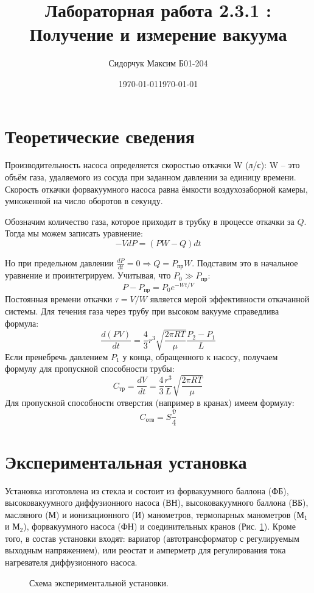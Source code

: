 \documentclass[a4paper,12pt]{article} %
\date{\today}
\title{Лабораторная работа 2.3.1 : Получение и измерение вакуума}
\author{Сидорчук Максим Б01-204}
\date{\today}
\begin{document}
\maketitle

\section{Теоретические сведения}
Производительность насоса определяется скоростью откачки W (л/с): W -- это объём газа, удаляемого из сосуда при заданном давлении за единицу времени. Скорость откачки форвакуумного насоса равна ёмкости воздухозаборной камеры, умноженной на число оборотов в секунду.

Обозначим количество газа, которое приходит в трубку в процессе откачки за \(Q\). Тогда мы можем записать уравнение:
\[-VdP = (PW - Q)dt\]

Но при предельном давлении \(\frac{dP}{dt} = 0 \Rightarrow Q = P_{пр}W\). Подставим это в начальное уравнение и проинтегрируем. Учитывая, что \(P_0 \gg P_{пр}\):
\[
    P - P_{\text{пр}} = P_0 e^{-Wt/V}
\]
Постоянная времени откачки $\tau = V/W$ является мерой эффективности откачанной системы.
Для течения газа через трубу при высоком вакууме справедлива формула:
\[\frac{d(PV)}{dt} = \frac{4}{3}r^3\sqrt{\frac{2\pi RT}{\mu}} \frac{P_2 - P_1}{L}\]
Если пренебречь давлением $P_1$ у конца, обращенного к насосу, получаем формулу для пропускной способности трубы:
\[C_{тр} = \frac{dV}{dt} = \frac{4}{3}\frac{r^3}{L}\sqrt{\frac{2\pi RT}{\mu}}\]
Для пропускной способности отверстия (например в кранах) имеем формулу:
\[C_{отв}=S\frac{\bar v}{4}\]

\section{Экспериментальная установка}

Установка изготовлена из стекла и состоит из форвакуумного баллона (ФБ), высоковакуумного диффузионного насоса (ВН), высоковакуумного баллона (ВБ), масляного (М) и ионизационного (И) манометров, термопарных манометров (М$_1$ и М$_2$), форвакуумного насоса (ФН) и соединительных кранов (Рис. \ref{ris:ustanovka}). Кроме того, в состав установки входят: вариатор (автотрансформатор с регулируемым выходным напряжением), или реостат и амперметр для регулирования тока нагревателя диффузионного насоса.
\begin{figure}[H]
    \caption{Схема экспериментальной установки.}
    \label{ris:ustanovka}
\end{figure}
\end{document}
